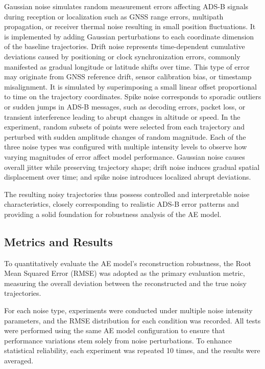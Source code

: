 Gaussian noise simulates random measurement errors affecting ADS-B signals during reception or localization such as GNSS range errors, multipath propagation, or receiver thermal noise resulting in small position fluctuations. It is implemented by adding Gaussian perturbations to each coordinate dimension of the baseline trajectories.
Drift noise represents time-dependent cumulative deviations caused by positioning or clock synchronization errors, commonly manifested as gradual longitude or latitude shifts over time. This type of error may originate from GNSS reference drift, sensor calibration bias, or timestamp misalignment. It is simulated by superimposing a small linear offset proportional to time on the trajectory coordinates.
Spike noise corresponds to sporadic outliers or sudden jumps in ADS-B messages, such as decoding errors, packet loss, or transient interference leading to abrupt changes in altitude or speed. In the experiment, random subsets of points were selected from each trajectory and perturbed with sudden amplitude changes of random magnitude.
Each of the three noise types was configured with multiple intensity levels to observe how varying magnitudes of error affect model performance. Gaussian noise causes overall jitter while preserving trajectory shape; drift noise induces gradual spatial displacement over time; and spike noise introduces localized abrupt deviations.

The resulting noisy trajectories thus possess controlled and interpretable noise characteristics, closely corresponding to realistic ADS-B error patterns and providing a solid foundation for robustness analysis of the AE model.

\subsection{Metrics and Results}
To quantitatively evaluate the AE model’s reconstruction robustness, the Root Mean Squared Error (RMSE) was adopted as the primary evaluation metric, measuring the overall deviation between the reconstructed and the true noisy trajectories.

For each noise type, experiments were conducted under multiple noise intensity parameters, and the RMSE distribution for each condition was recorded. All tests were performed using the same AE model configuration to ensure that performance variations stem solely from noise perturbations. To enhance statistical reliability, each experiment was repeated 10 times, and the results were averaged.


